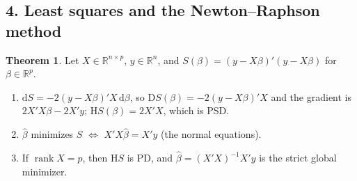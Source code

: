 \documentclass[12pt]{article}
\newcommand{\R}{\mathbb R}
\DeclareMathOperator{\rank}{rank}
\theoremstyle{definition}
\newtheorem{theorem}{Theorem}
\begin{document}
\subsection*{4. Least squares and the Newton--Raphson method}

\begin{theorem}\label{b16.41}
Let \(X\in\R^{n\times p}\), \(y\in\R^n\), and \(S(\beta)=(y-X\beta)'(y-X\beta)\) for \(\beta\in\R^p\).
\begin{enumerate}
\item \(\mathrm{d}S=-2(y-X\beta)'X\,\mathrm{d}\beta\), so \(\mathrm DS(\beta)=-2(y-X\beta)'X\) and the gradient is
\(2X'X\beta-2X'y\); \(\mathrm HS(\beta)=2X'X\), which is PSD.
\item \(\hat\beta\) minimizes \(S\) \(\iff\) \(X'X\hat\beta=X'y\) (the normal equations).
\item If \(\rank X=p\), then \(\mathrm HS\) is PD, and \(\hat\beta=(X'X)^{-1}X'y\) is the strict global minimizer.
\end{enumerate}
\end{theorem}
\end{document}
